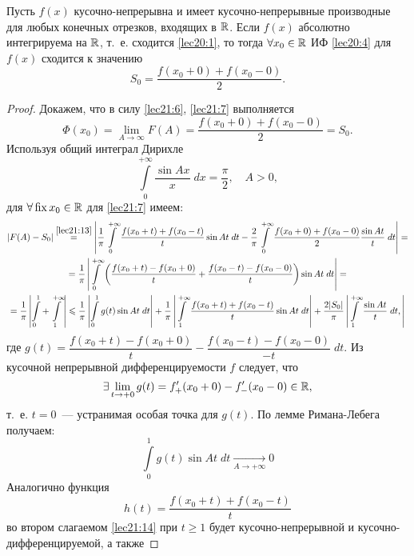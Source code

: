 \documentclass[../../main.tex]{subfiles}
\begin{document}
\begin{thm}[о сходимости ИФ]
	Пусть $ f(x) $ кусочно-непрерывна и имеет кусочно-непрерывные
	производные для любых конечных отрезков, входящих в $ \mathbb{R} $.
	Если $ f(x) $ абсолютно интегрируема на $ \mathbb{R} $, т.~е.
	сходится \eqref{lec20:1}, то тогда 
	$ \forall x_0 \in \mathbb{R} $ ИФ \eqref{lec20:4} для $ f(x) $ сходится
	к значению 
	\begin{equation}
	\label{lec21:13}
	S_0 = \dfrac{f(x_0 + 0) + f(x_0 - 0)}{2}.
	\end{equation}
\end{thm}
\begin{proof}
	Докажем, что в силу \eqref{lec21:6}, \eqref{lec21:7} выполняется
	\[\Phi(x_0) = \lim\limits_{A \to \infty} F(A) = 
	\dfrac{f(x_0 + 0) + f(x_0 - 0)}{2} = S_0.\]
	Используя общий интеграл Дирихле 
	\[
	\int\limits_{0}^{+\infty} \dfrac{\sin Ax}{x}\;dx = 
	\dfrac{\pi}{2}, \quad A > 0,
	\]
	для $ \forall \operatorname{fix} x_0 \in \mathbb{R} $ для \eqref{lec21:7} имеем:
	\begin{equation}
	\label{lec21:14}
	\begin{gathered}
	|F(A) - S_0| \stackrel{\eqref{lec21:13}}{=}
	\left|
	\dfrac{1}{\pi}
	\int\limits_{0}^{+\infty}
	\dfrac{f(x_0 + t) + f(x_0 - t)}{t} \sin At\;dt - 
	\dfrac{2}{\pi} \int\limits_{0}^{+\infty} 
	\dfrac{f(x_0 + 0) + f(x_0 - 0)}{2} \dfrac{\sin At}{t}\;dt
	\right| = \\ =
	\dfrac{1}{\pi} \left|
	\int\limits_{0}^{+\infty} \left(
	\dfrac{f(x_0 + t) - f(x_0 + 0)}{t} +
	\dfrac{f(x_0 - t) - f(x_0 - 0) }{t}
	\right)
	\sin At\;dt
	\right| = \\ = \dfrac{1}{\pi}
	\left|
	\int\limits_{0}^{1} + \int\limits_{1}^{+\infty}
	\right| \leqslant \dfrac{1}{\pi}
	\left|
	\int\limits_{0}^{1} g(t) \sin At\;dt
	\right| + \dfrac{1}{\pi}
	\left|
	\int\limits_{1}^{+\infty} 
	\dfrac{f(x_0 + t) + f(x_0 - t)}{t} \sin At\;dt
	\right| + \dfrac{2|S_0|}{\pi}
	\left|
	\int\limits_{1}^{+\infty} \dfrac{\sin At}{t}\;dt,
	\right|
	\end{gathered}
	\end{equation} где $ g(t) = \dfrac{f(x_0 + t) - f(x_0 + 0)}{t} - 
	\dfrac{f(x_0 - t) - f(x_0 - 0)}{-t}\;dt $.
	Из кусочной непрерывной дифференцируемости $f$ следует, что
	\[
	\exists \lim\limits_{t \to +0} g(t) =
	f_+'(x_0 + 0) - f_-'(x_0 - 0) \in \mathbb{R},
	\] т.~е. $ t = 0 $~--- устранимая особая точка для $ g(t)$.
	По лемме Римана-Лебега получаем:
	\[
	\int\limits_{0}^{1} g(t) \sin At\;dt
	\underset{A \to +\infty}{\to} 0
	\]
	Аналогично функция \[
	h(t) = \dfrac{f(x_0 + t) + f(x_0 - t)}{t}
	\] во втором слагаемом \eqref{lec21:14} при 
	$ t \geq 1 $ будет кусочно-непрерывной и кусочно-дифференцируемой, а также

\end{proof}
\end{document}
